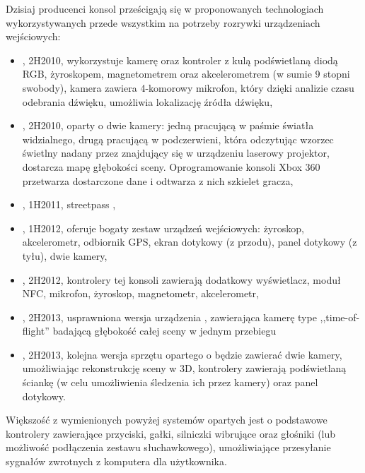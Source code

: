 Dzisiaj producenci konsol prześcigają się w proponowanych technologiach wykorzystywanych przede wszystkim na potrzeby rozrywki urządzeniach wejściowych:
\begin{itemize}
 \item {}, 2H2010, wykorzystuje kamerę oraz kontroler z kulą podświetlaną diodą RGB, żyroskopem, magnetometrem oraz akcelerometrem (w sumie 9 stopni swobody), kamera zawiera 4-komorowy mikrofon, który dzięki analizie czasu odebrania dźwięku, umożliwia lokalizację źródła dźwięku,
 \item {}, 2H2010, oparty o dwie kamery: jedną pracującą w paśmie światła widzialnego, drugą pracującą w podczerwieni, która odczytując wzorzec świetlny nadany przez znajdujący się w urządzeniu laserowy projektor, dostarcza mapę głębokości sceny. Oprogramowanie konsoli Xbox 360 przetwarza dostarczone dane i odtwarza z nich szkielet gracza,
 \item {}, 1H2011, streetpass ,
 \item {}, 1H2012, oferuje bogaty zestaw urządzeń wejściowych: żyroskop, akcelerometr, odbiornik GPS, ekran dotykowy (z przodu), panel dotykowy (z tyłu), dwie kamery,
 \item {}, 2H2012, kontrolery tej konsoli zawierają dodatkowy wyświetlacz, moduł NFC, mikrofon, żyroskop, magnetometr, akcelerometr,
 \item {}, 2H2013, usprawniona wersja urządzenia , zawierająca kamerę type ,,time-of-flight'' badającą głębokość całej sceny w jednym przebiegu
 \item {}, 2H2013, kolejna wersja sprzętu opartego o  będzie zawierać dwie kamery, umożliwiając rekonstrukcję sceny w 3D, kontrolery zawierają  podświetlaną ściankę (w celu umożliwienia śledzenia ich przez kamery) oraz panel dotykowy.
\end{itemize}

Większość z wymienionych powyżej systemów opartych jest o podstawowe kontrolery zawierające przyciski, gałki, silniczki wibrujące oraz głośniki (lub możliwość podłączenia zestawu słuchawkowego), umożliwiające przesyłanie sygnałów zwrotnych z komputera dla użytkownika.

